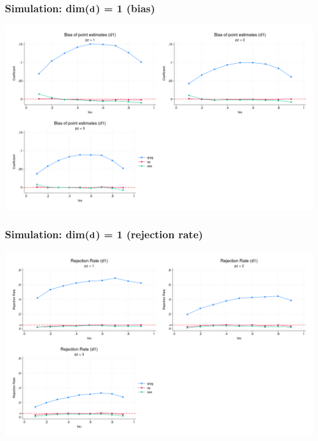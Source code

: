 \documentclass[11pt]{beamer}
\begin{document}
\begin{frame}
  \frametitle{Simulation: dim($\mathbf{d}$) = 1 (bias)}
  \begin{center} 
\includegraphics[scale=0.2]{eps/mbias_d1}
\end{center}
\end{frame}

\begin{frame}
  \frametitle{Simulation: dim($\mathbf{d}$) = 1 (rejection rate)}
  \begin{center} 
\includegraphics[scale=0.2]{eps/rej_d1}
\end{center}
\end{frame}
\end{document}
